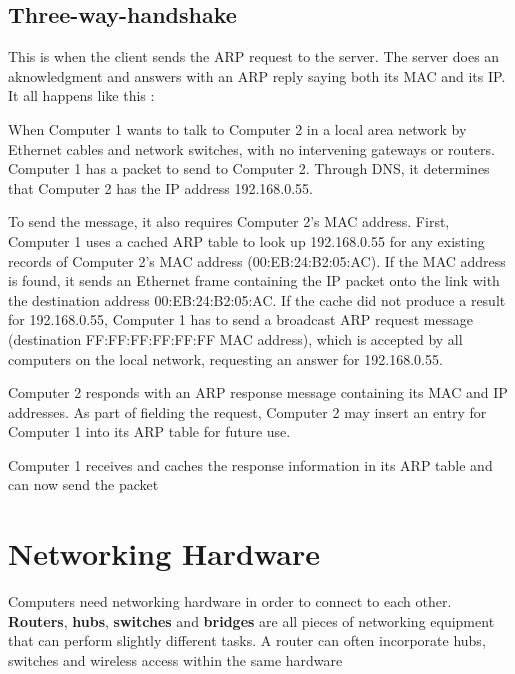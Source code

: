 \documentclass[a4paper,12pt]{article}
\begin{document}
\subsection{Three-way-handshake}
This is when the client sends the ARP request to the server. The server does an aknowledgment and answers with an ARP reply saying both its MAC and its IP. It all happens like this :

When Computer 1 wants to talk to  Computer 2 in a local area network by Ethernet cables and network switches, with no intervening gateways or routers. Computer 1 has a packet to send to Computer 2. Through DNS, it determines that Computer 2 has the IP address 192.168.0.55.

To send the message, it also requires Computer 2's MAC address. First, Computer 1 uses a cached ARP table to look up 192.168.0.55 for any existing records of Computer 2's MAC address (00:EB:24:B2:05:AC). If the MAC address is found, it sends an Ethernet frame containing the IP packet onto the link with the destination address 00:EB:24:B2:05:AC. If the cache did not produce a result for 192.168.0.55, Computer 1 has to send a broadcast ARP request message (destination FF:FF:FF:FF:FF:FF MAC address), which is accepted by all computers on the local network, requesting an answer for 192.168.0.55.

Computer 2 responds with an ARP response message containing its MAC and IP addresses. As part of fielding the request, Computer 2 may insert an entry for Computer 1 into its ARP table for future use.

Computer 1 receives and caches the response information in its ARP table and can now send the packet

\clearpage

\section{Networking Hardware}
Computers need networking hardware in order to connect to each other. \textbf{Routers}, \textbf{hubs}, \textbf{switches} and \textbf{bridges} are all pieces of networking equipment that can perform slightly different tasks. A router can often incorporate hubs, switches and wireless access within the same hardware
\end{document}
